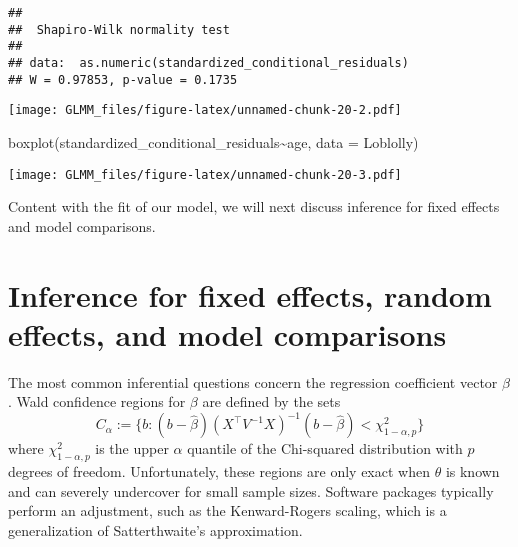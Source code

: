\documentclass[
]{book}
\newenvironment{Shaded}{\begin{snugshade}}{\end{snugshade}}
\newcommand{\AttributeTok}[1]{\textcolor[rgb]{0.77,0.63,0.00}{#1}}
\newcommand{\DecValTok}[1]{\textcolor[rgb]{0.00,0.00,0.81}{#1}}
\newcommand{\FunctionTok}[1]{\textcolor[rgb]{0.00,0.00,0.00}{#1}}
\newcommand{\NormalTok}[1]{#1}
\newcommand{\OtherTok}[1]{\textcolor[rgb]{0.56,0.35,0.01}{#1}}
\newcommand{\SpecialCharTok}[1]{\textcolor[rgb]{0.00,0.00,0.00}{#1}}
\newcommand{\StringTok}[1]{\textcolor[rgb]{0.31,0.60,0.02}{#1}}
\begin{document}
\begin{verbatim}
## 
##  Shapiro-Wilk normality test
## 
## data:  as.numeric(standardized_conditional_residuals)
## W = 0.97853, p-value = 0.1735
\end{verbatim}

\begin{Shaded}
\end{Shaded}

\texttt{[image: GLMM\_files/figure-latex/unnamed-chunk-20-2.pdf]}

\begin{Shaded}
\begin{Highlighting}[]
\FunctionTok{boxplot}\NormalTok{(standardized\_conditional\_residuals}\SpecialCharTok{\textasciitilde{}}\NormalTok{age, }\AttributeTok{data =}\NormalTok{ Loblolly)}
\end{Highlighting}
\end{Shaded}

\texttt{[image: GLMM\_files/figure-latex/unnamed-chunk-20-3.pdf]}

Content with the fit of our model, we will next discuss inference for fixed effects and model comparisons.

\hypertarget{inference-for-fixed-effects-random-effects-and-model-comparisons}{%
\section{Inference for fixed effects, random effects, and model comparisons}\label{inference-for-fixed-effects-random-effects-and-model-comparisons}}

The most common inferential questions concern the regression coefficient vector \(\beta\). Wald confidence regions for \(\beta\) are defined by the sets
\[C_\alpha := \{b: (b - \hat\beta)(X^\top V^{-1}X)^{-1}(b - \hat\beta)<\chi^2_{1-\alpha, p}\}\]
where \(\chi^2_{1-\alpha, p}\) is the upper \(\alpha\) quantile of the Chi-squared distribution with \(p\) degrees of freedom. Unfortunately, these regions are only exact when \(\theta\) is known and can severely undercover for small sample sizes. Software packages typically perform an adjustment, such as the Kenward-Rogers scaling, which is a generalization of Satterthwaite's approximation.
\end{document}
